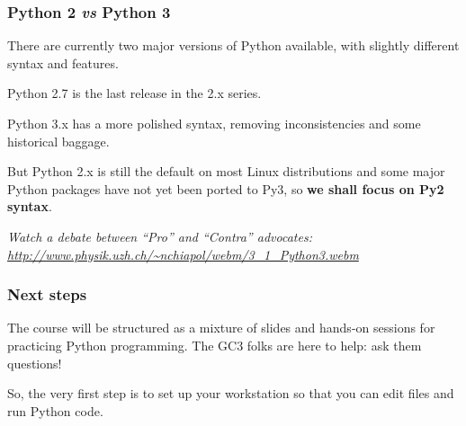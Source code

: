 \documentclass[english,serif,mathserif,xcolor=pdftex,dvipsnames,table]{beamer}
\begin{document}
\begin{frame}[fragile]
  \frametitle{Python 2 \emph{vs} Python 3}

  There are currently two major versions of Python available, with
  slightly different syntax and features.

  \+
  Python 2.7 is the last release in the 2.x series.

  \+
  Python 3.x has a more polished syntax, removing inconsistencies and
  some historical baggage.

  \+
  But Python 2.x is still the default on most Linux distributions
  and some major Python packages have not yet been ported to Py3, so
  \textbf{we shall focus on Py2 syntax}.

  \+
  {\footnotesize\em
    Watch a debate between ``Pro'' and ``Contra'' advocates:
    \url{http://www.physik.uzh.ch/~nchiapol/webm/3_1_Python3.webm}}
\end{frame}


\begin{frame}
  \frametitle{Next steps}

  The course will be structured as a mixture of slides and hands-on
  sessions for practicing Python programming.  The GC3 folks are here
  to help: ask them questions!

  \+
  So, the very first step is to set up your workstation so that you
  can edit files and run Python code.
\end{frame}
\end{document}

